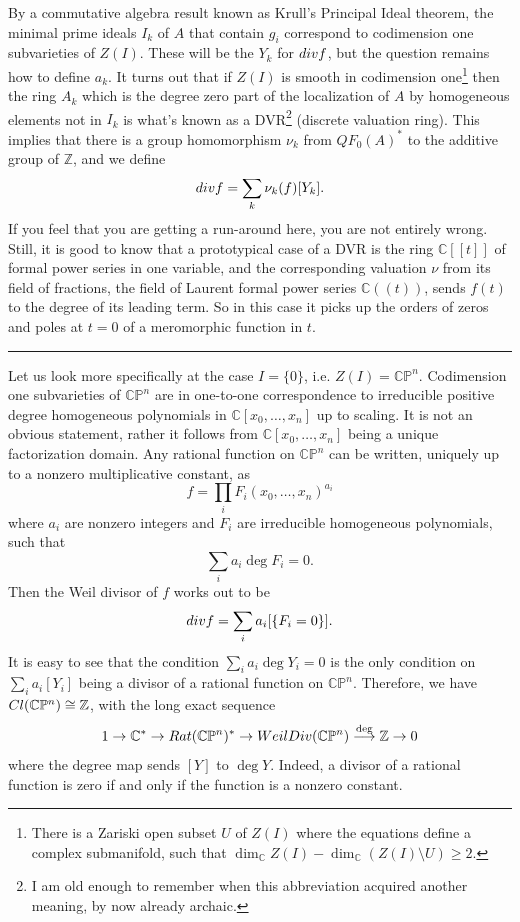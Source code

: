 \documentclass[11pt]{article}
\numberwithin{equation}{section}
\numberwithin{footnote}{section}
\newcommand{\blue}{\color{blue}}
\renewcommand{\P}{{\mathbb P}}
\newcommand{\Z}{{\mathbb Z}}
\newcommand{\C}{{\mathbb C}}
\begin{document}
\smallskip
By a commutative algebra result known as Krull's Principal Ideal theorem, the minimal prime ideals $I_k$ of $A$ that contain $g_i$ correspond to codimension one subvarieties of $Z(I)$. These will be the $Y_k$ for ${\rm div}f$, but the question remains how to define $a_k$. It turns out that if $Z(I)$ is smooth in codimension one\footnote{ There is a Zariski open subset  $U$ of $Z(I)$ where the equations define a complex submanifold, such that $\dim_\C Z(I) -\dim_\C(Z(I)\setminus U) \geq 2$.} then the ring $A_k$ which is the degree zero part of the localization of $A$ by homogeneous elements not in $I_k$ is what's known as a DVR\footnote{ I am old enough to remember when this abbreviation acquired another meaning, by now already archaic.} ({\blue discrete valuation ring}). This implies that there is a group homomorphism $\nu_k$ from $QF_0(A)^*$ to the additive group of $\Z$, and we define 
$$
{\rm div}f = \sum_k \nu_k(f) [Y_k].
$$
If you feel that you are getting a run-around here, you are not entirely wrong. Still, it is good to know that a prototypical case of a DVR is the ring $\C[[t]]$ of formal power series in one variable, and the corresponding valuation $\nu$ from its field of fractions, the field of Laurent formal power series $\C((t))$, sends $f(t)$ to the degree of its leading term. So in this case it picks up the orders of zeros and poles at $t=0$ of a meromorphic function in $t$.

\smallskip
{\blue \hrule}

Let us look more specifically at the case $I=\{0\}$, i.e. $Z(I)=\C\P^n$. Codimension one subvarieties of $\C\P^n$ are in one-to-one correspondence to irreducible positive degree homogeneous polynomials in $\C[x_0,\ldots,x_n]$ up to scaling. It is not an obvious 
statement, rather it follows from $\C[x_0,\ldots,x_n]$ being a unique factorization domain. Any rational function on $\C\P^n$ can be written, uniquely up to a nonzero multiplicative constant, as 
$$
f=\displaystyle\prod_i F_i(x_0,\ldots,x_n)^{a_i}
$$
where $a_i$ are nonzero integers and $F_i$ are irreducible homogeneous polynomials, such that 
$$
\sum_{i} a_i \deg F_i = 0.
$$
Then the Weil divisor of $f$ works out to be 
\begin{equation}\label{zerosum}
{\rm div} f = \sum_i a_i [\{F_i=0\}].
\end{equation}
It is easy to see that the condition $\sum_i a_i \deg Y_i=0$ is the only condition on $\sum_i a_i [Y_i]$ being a divisor of a rational function on $\C\P^n$. Therefore, we have ${\rm Cl}(\C\P^n)\cong \Z$, with the long exact sequence
$$
1 \to \C^* \to {\rm Rat}(\C\P^n)^*\to {\rm WeilDiv}(\C\P^n)\stackrel{\deg}{\longrightarrow}\Z\to 0
$$
where the degree map sends $[Y]$ to $\deg Y$. Indeed, a divisor of a rational function is zero if and only if the function is a nonzero constant.
\end{document}
